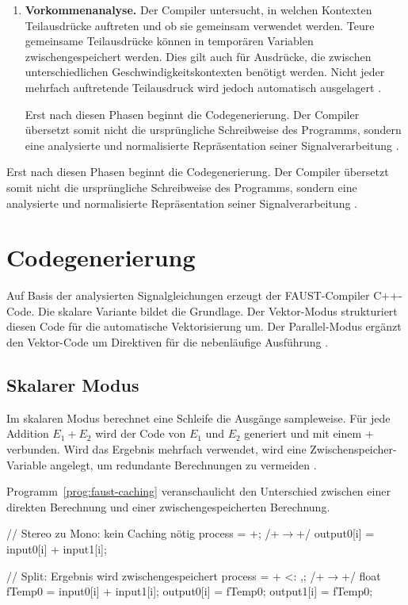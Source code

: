 \begin{enumerate}
	\item \textbf{Vorkommenanalyse.} Der Compiler untersucht, in welchen Kontexten Teilausdrücke auftreten und ob sie gemeinsam verwendet werden. Teure gemeinsame Teilausdrücke können in temporären Variablen zwischengespeichert werden. Dies gilt auch für Ausdrücke, die zwischen unterschiedlichen Geschwindigkeitskontexten benötigt werden. Nicht jeder mehrfach auftretende Teilausdruck wird jedoch automatisch ausgelagert \parencite[S.~13]{orlarey:hal-02159014}.
	
	Erst nach diesen Phasen beginnt die Codegenerierung. Der Compiler übersetzt somit nicht die ursprüngliche Schreibweise des Programms, sondern eine analysierte und normalisierte Repräsentation seiner Signalverarbeitung \parencite[S.~13]{orlarey:hal-02159014}.
\end{enumerate}

Erst nach diesen Phasen beginnt die Codegenerierung. Der Compiler übersetzt somit nicht die ursprüngliche Schreibweise des Programms, sondern eine analysierte und normalisierte Repräsentation seiner Signalverarbeitung \parencite[S.~13]{orlarey:hal-02159014}.

\section {Codegenerierung}

Auf Basis der analysierten Signalgleichungen erzeugt der FAUST-Compiler C++-Code. Die skalare Variante bildet die Grundlage. Der Vektor-Modus strukturiert diesen Code für die automatische Vektorisierung um. Der Parallel-Modus ergänzt den Vektor-Code um Direktiven für die nebenläufige Ausführung \parencite[S.~13--21]{orlarey:hal-02159014}.

\subsection{Skalarer Modus}
Im skalaren Modus berechnet eine Schleife die Ausgänge sampleweise. Für jede Addition $E_1 + E_2$ wird der Code von $E_1$ und $E_2$ generiert und mit einem $+$ verbunden. Wird das Ergebnis mehrfach verwendet, wird eine Zwischenspeicher-Variable angelegt, um redundante Berechnungen zu vermeiden \parencite[S.~13--14]{orlarey:hal-02159014}.

Programm~\ref{prog:faust-caching} veranschaulicht den Unterschied zwischen einer direkten Berechnung und einer zwischengespeicherten Berechnung.


\begin{program}
	\caption{Zwischenspeicherung eines gemeinsam verwendeten Teilausdrucks}
	\label{prog:faust-caching}
	\begin{CCode}
		// Stereo zu Mono: kein Caching nötig
		process = +;
		/+$\rightarrow$+/ output0[i] = input0[i] + input1[i];
		
		// Split: Ergebnis wird zwischengespeichert
		process = + <: ,;
		/+$\rightarrow$+/ float fTemp0 = input0[i] + input1[i];
		output0[i] = fTemp0;
		output1[i] = fTemp0;
	\end{CCode}
\end{program}

